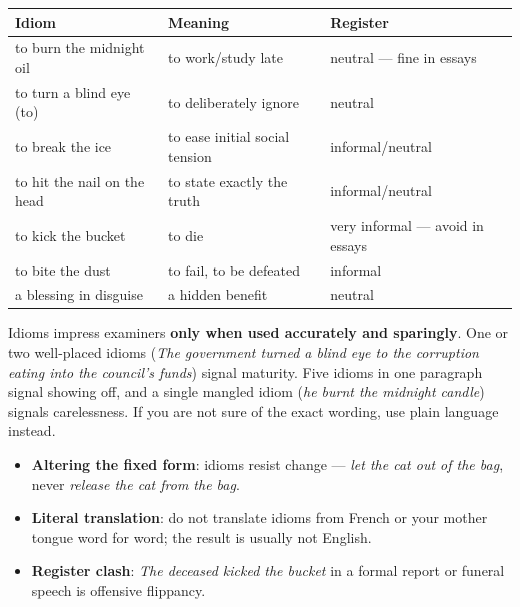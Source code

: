 \documentclass[11pt]{article}
\begin{document}
\begin{exemplebox}
\begin{center}
\begin{tabularx}{\linewidth}{|l|X|X|}
\hline
\rowcolor{popblueL} \textbf{Idiom} & \textbf{Meaning} & \textbf{Register} \\
\hline
to burn the midnight oil & to work/study late & neutral — fine in essays \\
\hline
to turn a blind eye (to) & to deliberately ignore & neutral \\
\hline
to break the ice & to ease initial social tension & informal/neutral \\
\hline
to hit the nail on the head & to state exactly the truth & informal/neutral \\
\hline
to kick the bucket & to die & very informal — avoid in essays \\
\hline
to bite the dust & to fail, to be defeated & informal \\
\hline
a blessing in disguise & a hidden benefit & neutral \\
\hline
\end{tabularx}
\end{center}
\end{exemplebox}

\begin{aretenir}
Idioms impress examiners \textbf{only when used accurately and sparingly}. One or two well-placed idioms (\emph{The government turned a blind eye to the corruption eating into the council's funds}) signal maturity. Five idioms in one paragraph signal showing off, and a single mangled idiom (\emph{he burnt the midnight candle}) signals carelessness. If you are not sure of the exact wording, use plain language instead.
\end{aretenir}

\begin{attention}
\begin{itemize}
\item \textbf{Altering the fixed form}: idioms resist change — \emph{let the cat out of the bag}, never \emph{release the cat from the bag}.
\item \textbf{Literal translation}: do not translate idioms from French or your mother tongue word for word; the result is usually not English.
\item \textbf{Register clash}: \emph{The deceased kicked the bucket} in a formal report or funeral speech is offensive flippancy.
\end{itemize}
\end{attention}
\end{document}

